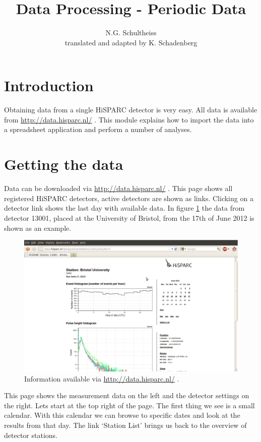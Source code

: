 \documentclass[12pt,a4paper]{article}
\author{N.G. Schultheiss \\ translated and adapted by K. Schadenberg}
\date{}
\title{Data Processing - Periodic Data}
\numberwithin{equation}{section}
\numberwithin{figure}{section}
\numberwithin{table}{section}
\begin{document}
\maketitle

\section{Introduction}
Obtaining data from a single HiSPARC detector is very easy. All data is available from \url{http://data.hisparc.nl/} . This module explains how to import the data into a spreadsheet application and perform a number of analyses.

\section{Getting the data}
Data can be downloaded via \url{http://data.hisparc.nl/} . This page shows all registered HiSPARC detectors, active detectors are shown as links. Clicking on a detector link shows the last day with available data. In figure \ref{fig:data_screen} the data from detector 13001, placed at the University of Bristol, from the 17th of June 2012 is shown as an example.

\begin{figure}\begin{center}
\includegraphics[scale=0.35]{Screenshot_HiSPARC_Station_13001.eps}
\caption{Information available via \protect\url{http://data.hisparc.nl/} .}\label{fig:data_screen}
\end{center}\end{figure}

This page shows the measurement data on the left and the detector settings on the right. Lets start at the top right of the page. The first thing we see is a small calendar. With this calendar we can browse to specific dates and look at the results from that day. The link `Station List' brings us back to the overview of detector stations.
\end{document}
